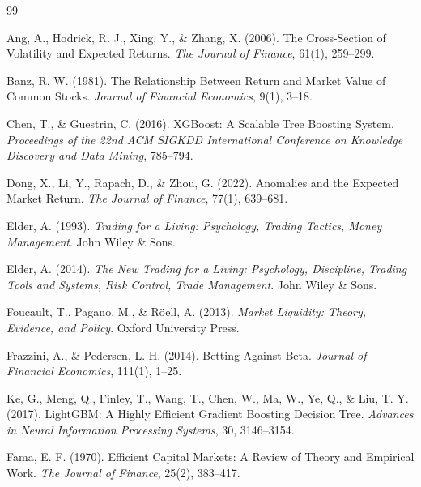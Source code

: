 \documentclass[11pt,a4paper]{article}
\begin{document}
\begin{thebibliography}{99}

Ang, A., Hodrick, R. J., Xing, Y., \& Zhang, X. (2006).
\newblock The Cross-Section of Volatility and Expected Returns.
\newblock \textit{The Journal of Finance}, 61(1), 259--299.

Banz, R. W. (1981).
\newblock The Relationship Between Return and Market Value of Common Stocks.
\newblock \textit{Journal of Financial Economics}, 9(1), 3--18.

Chen, T., \& Guestrin, C. (2016).
\newblock XGBoost: A Scalable Tree Boosting System.
\newblock \textit{Proceedings of the 22nd ACM SIGKDD International Conference on Knowledge Discovery and Data Mining}, 785--794.

Dong, X., Li, Y., Rapach, D., \& Zhou, G. (2022).
\newblock Anomalies and the Expected Market Return.
\newblock \textit{The Journal of Finance}, 77(1), 639--681.

Elder, A. (1993).
\newblock \textit{Trading for a Living: Psychology, Trading Tactics, Money Management}.
\newblock John Wiley \& Sons.

Elder, A. (2014).
\newblock \textit{The New Trading for a Living: Psychology, Discipline, Trading Tools and Systems, Risk Control, Trade Management}.
\newblock John Wiley \& Sons.

Foucault, T., Pagano, M., \& Röell, A. (2013).
\newblock \textit{Market Liquidity: Theory, Evidence, and Policy}.
\newblock Oxford University Press.

Frazzini, A., \& Pedersen, L. H. (2014).
\newblock Betting Against Beta.
\newblock \textit{Journal of Financial Economics}, 111(1), 1--25.

Ke, G., Meng, Q., Finley, T., Wang, T., Chen, W., Ma, W., Ye, Q., \& Liu, T. Y. (2017).
\newblock LightGBM: A Highly Efficient Gradient Boosting Decision Tree.
\newblock \textit{Advances in Neural Information Processing Systems}, 30, 3146--3154.

Fama, E. F. (1970).
\newblock Efficient Capital Markets: A Review of Theory and Empirical Work.
\newblock \textit{The Journal of Finance}, 25(2), 383--417.


\end{thebibliography}
\end{document}
